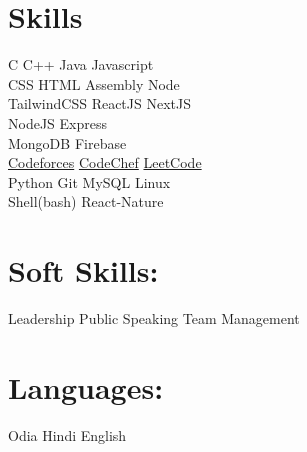 \documentclass[]{deedy-resume-openfont}
\begin{document}
\begin{minipage}[t]{0.33\textwidth}
\section{Skills}
 C \textbullet{} C++ 
\textbullet{} Java \textbullet{} Javascript \\ 
CSS \textbullet{} HTML \textbullet{} Assembly \textbullet{} Node \\
    TailwindCSS \textbullet{} ReactJS \textbullet{} NextJS \\
   NodeJS \textbullet{} Express \\ 
  MongoDB \textbullet{} Firebase \\
\href{https://codeforces.com/profile/GerrySup22}{Codeforces} \textbullet{} \href{https://www.codechef.com/users/ditu_22}{CodeChef} \textbullet{}
\href{https://leetcode.com/ditu22/}{LeetCode} \\

 Python \textbullet{} Git \textbullet{} MySQL
\textbullet{} Linux \\
Shell(bash) \textbullet{} React-Nature
\sectionsep 

\section{Soft Skills:}
Leadership \textbullet{} Public Speaking \textbullet{} Team Management \\
\section{Languages:}
Odia \textbullet{} Hindi \textbullet{} English

%
%

\end{minipage} 
\hfill
\end{document}
